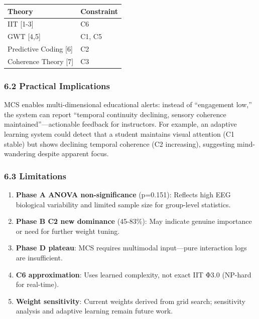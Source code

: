\documentclass[
]{article}
\newcounter{none} %
\providecommand{\tightlist}{%
  \setlength{\itemsep}{0pt}\setlength{\parskip}{0pt}}
\begin{document}
{\def\LTcaptype{none} %
\begin{longtable}[]{@{}ll@{}}
\toprule\noalign{}
Theory & Constraint \\
\midrule\noalign{}
\endhead
\bottomrule\noalign{}
\endlastfoot
IIT {[}1-3{]} & C6 \\
GWT {[}4,5{]} & C1, C5 \\
Predictive Coding {[}6{]} & C2 \\
Coherence Theory {[}7{]} & C3 \\
\end{longtable}
}

\subsubsection{6.2 Practical Implications}\label{practical-implications}

MCS enables multi-dimensional educational alerts: instead of
``engagement low,'' the system can report ``temporal continuity
declining, sensory coherence maintained''---actionable feedback for
instructors. For example, an adaptive learning system could detect that
a student maintains visual attention (C1 stable) but shows declining
temporal coherence (C2 increasing), suggesting mind-wandering despite
apparent focus.

\subsubsection{6.3 Limitations}\label{limitations}

\begin{enumerate}
\def\labelenumi{\arabic{enumi}.}
\tightlist
\item
  \textbf{Phase A ANOVA non-significance} (p=0.151): Reflects high EEG
  biological variability and limited sample size for group-level
  statistics.
\item
  \textbf{Phase B C2 new dominance} (45-83\%): May indicate genuine
  importance or need for further weight tuning.
\item
  \textbf{Phase D plateau}: MCS requires multimodal input---pure
  interaction logs are insufficient.
\item
  \textbf{C6 approximation}: Uses learned complexity, not exact IIT Φ3.0
  (NP-hard for real-time).
\item
  \textbf{Weight sensitivity}: Current weights derived from grid search;
  sensitivity analysis and adaptive learning remain future work.
\end{enumerate}
\end{document}
